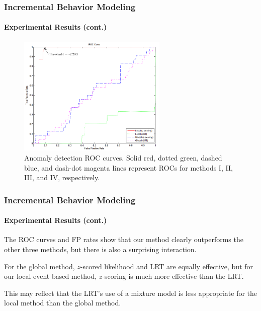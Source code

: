 \begin{frame}
    \frametitle{Incremental Behavior Modeling}
    \framesubtitle{Experimental Results (cont.)}
    
    \begin{figure}
        \centering
        \includegraphics[width=2.8in]{figures/roc-ours-vs-global-results}
        \caption{Anomaly detection ROC
            curves. Solid red, dotted green, dashed blue, and dash-dot magenta
            lines represent ROCs for methods I, II, III, and IV,
            respectively.}
        \label{fig:roc-ours-vs-global-results}
    \end{figure}

\end{frame}


\begin{frame}
    \frametitle{Incremental Behavior Modeling}
    \framesubtitle{Experimental Results (cont.)}
    
    The ROC curves and FP rates show that our method clearly outperforms
    the other three methods, but there is also a surprising interaction.

    \bigskip

    For the global method, $z$-scored likelihood and LRT are equally
    effective, but for our local event based method, $z$-scoring is much
    more effective than the LRT.  
    
    \bigskip
    
    This may reflect that the LRT's use of a mixture model is less 
    appropriate for the local method than the global method.
    
\end{frame}


